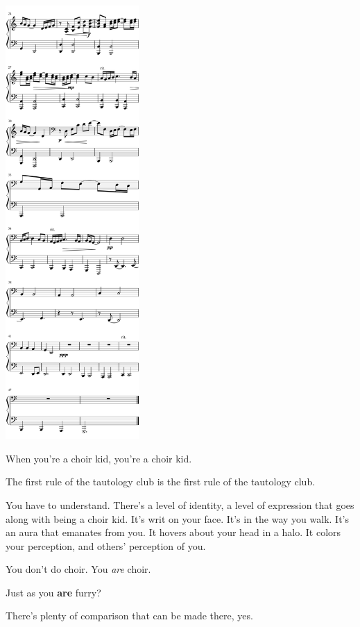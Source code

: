 \begin{paracol}{2}
\begin{rightcolumn*}
  \begin{flushright}
\noindent\includegraphics[width=2in]{assets/static/miniatures/5-2.png}
\end{flushright}
\end{rightcolumn*}
\begin{leftcolumn}

\noindent When you're a choir kid, you're a choir kid.

\begin{ally}
The first rule of the tautology club is the first rule of the tautology club.
\end{ally}
You have to understand. There's a level of identity, a level of expression that goes along with being a choir kid. It's writ on your face. It's in the way you walk. It's an aura that emanates from you. It hovers about your head in a halo. It colors your perception, and others' perception of you.

You don't do choir. You \emph{are} choir.

\begin{ally}
Just as you \textbf{are} furry?
\end{ally}
There's plenty of comparison that can be made there, yes.


\end{leftcolumn}
\end{paracol}
